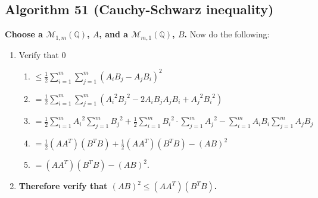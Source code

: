 \documentclass[twocolumn]{article}
\begin{document}
		\subsection{Algorithm 51 (Cauchy-Schwarz inequality)}\label{sec:algorithm 51}
			\textbf{Choose a $\mathcal{M}_{1,m}(\mathbb{Q})$, $A$, and a $\mathcal{M}_{m,1}(\mathbb{Q})$, $B$.} Now do the following:
			\begin{enumerate}
				\item Verify that $0$
				\begin{enumerate}
					\item $\le\frac{1}{2}\sum_{i=1}^m\sum_{j=1}^m (A_iB_j-A_jB_i)^2$
					\item $=\frac{1}{2}\sum_{i=1}^m\sum_{j=1}^m ({A_i}^2{B_j}^2-2A_iB_jA_jB_i+{A_j}^2{B_i}^2)$
					\item $=\frac{1}{2}\sum_{i=1}^m {A_i}^2\sum_{j=1}^m {B_j}^2+\frac{1}{2}\sum_{i=1}^m {B_i}^2\cdot\allowbreak\sum_{j=1}^m {A_j}^2-\sum_{i=1}^m A_iB_i\sum_{j=1}^m A_jB_j$
					\item $=\frac{1}{2}(AA^T)(B^TB)+\frac{1}{2}(AA^T)(B^TB)-(AB)^2$
					\item $=(AA^T)(B^TB)-(AB)^2$.
				\end{enumerate}
				\item \textbf{Therefore verify that $(AB)^2\le(AA^T)(B^TB)$.}
			\end{enumerate}
\end{document}
